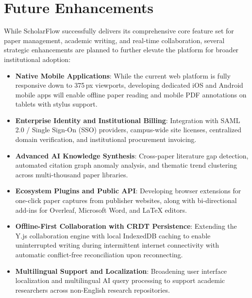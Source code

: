 \section{Future Enhancements}
While ScholarFlow successfully delivers its comprehensive core feature set for paper management, academic writing, and real-time collaboration, several strategic enhancements are planned to further elevate the platform for broader institutional adoption:

\begin{itemize}
\item \textbf{Native Mobile Applications}: While the current web platform is fully responsive down to 375\,px viewports, developing dedicated iOS and Android mobile apps will enable offline paper reading and mobile PDF annotations on tablets with stylus support.
\item \textbf{Enterprise Identity and Institutional Billing}: Integration with SAML 2.0 / Single Sign-On (SSO) providers, campus-wide site licenses, centralized domain verification, and institutional procurement invoicing.
\item \textbf{Advanced AI Knowledge Synthesis}: Cross-paper literature gap detection, automated citation graph anomaly analysis, and thematic trend clustering across multi-thousand paper libraries.
\item \textbf{Ecosystem Plugins and Public API}: Developing browser extensions for one-click paper captures from publisher websites, along with bi-directional add-ins for Overleaf, Microsoft Word, and LaTeX editors.
\item \textbf{Offline-First Collaboration with CRDT Persistence}: Extending the Y.js collaboration engine with local IndexedDB caching to enable uninterrupted writing during intermittent internet connectivity with automatic conflict-free reconciliation upon reconnecting.
\item \textbf{Multilingual Support and Localization}: Broadening user interface localization and multilingual AI query processing to support academic researchers across non-English research repositories.
\end{itemize}

